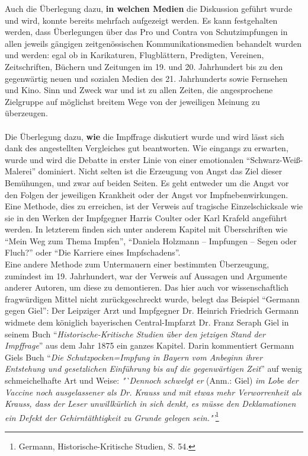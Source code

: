 \documentclass[
    a4paper,
    12pt,
    hyphens,
    chapterprefix=true,
    headheight=33pt,
    footheight=29pt,
    headings=optiontohead, %
]{scrartcl}
\begin{document}
{\newpage
Auch die Überlegung dazu, \textbf{in welchen Medien} die Diskussion geführt wurde und wird, konnte bereits mehrfach aufgezeigt werden. Es kann festgehalten werden, dass Überlegungen über das Pro und Contra von Schutzimpfungen in allen jeweils gängigen zeitgenössischen Kommunikationsmedien behandelt wurden und werden: egal ob in Karikaturen, Flugblättern, Predigten, Vereinen, Zeitschriften, Büchern und Zeitungen im 19. und 20. Jahrhundert bis zu den gegenwärtig neuen und sozialen Medien des 21. Jahrhunderts sowie Fernsehen und Kino. Sinn und Zweck war und ist zu allen Zeiten, die angesprochene Zielgruppe auf möglichst breitem Wege von der jeweiligen Meinung zu überzeugen.\\
\\
Die Überlegung dazu, \textbf{wie} die Impffrage diskutiert wurde und wird lässt sich dank des angestellten Vergleiches gut beantworten. Wie eingangs zu erwarten, wurde und wird die Debatte in erster Linie von einer emotionalen "`Schwarz-Weiß-Malerei"' dominiert. Nicht selten ist die Erzeugung von Angst das Ziel dieser Bemühungen, und zwar auf beiden Seiten. Es geht entweder um die Angst vor den Folgen der jeweiligen Krankheit oder der Angst vor Impfnebenwirkungen. Eine Methode, dies zu erreichen, ist der Verweis auf tragische Einzelschicksale wie sie in den Werken der Impfgegner Harris Coulter oder Karl Krafeld angeführt werden. In letzterem finden sich unter anderem Kapitel mit Überschriften wie "`Mein Weg zum Thema Impfen"', "`Daniela Holzmann -- Impfungen -- Segen oder Fluch?"' oder "`Die Karriere eines Impfschadens"'. \\
Eine andere Methode zum Untermauern einer bestimmten Überzeugung, zumindest im 19. Jahrhundert, war der Verweis auf Aussagen und Argumente anderer Autoren, um diese zu demontieren. Das hier auch vor wissenschaftlich fragwürdigen Mittel nicht zurückgeschreckt wurde, belegt das Beispiel "`Germann gegen Giel"': Der Leipziger Arzt und Impfgegner Dr. Heinrich Friedrich Germann widmete dem königlich bayerischen Central-Impfarzt Dr. Franz Seraph Giel in seinem Buch "`\textit{Historische-Kritische Studien über den jetzigen Stand der Impffrage}"' aus dem Jahr 1875 ein ganzes Kapitel. Darin kommentiert Germann Giels Buch "`\textit{Die Schutzpocken=Impfung in Bayern vom Anbeginn ihrer Entstehung und gesetzlichen Einführung bis auf die gegenwärtigen Zeit}"' auf wenig schmeichelhafte Art und Weise: \textit{"`Dennoch schwelgt er} (Anm.: Giel) \textit{im Lobe der Vaccine noch ausgelassener als Dr. Krauss und mit etwas mehr Verworrenheit als Krauss, dass der Leser unwillkürlich in sich denkt, es müsse den Deklamationen ein Defekt der Gehirntäthtigkeit zu Grunde gelegen sein."'}\footnote{Germann, Historische-Kritische Studien, S. 54.}\\
}
\end{document}
